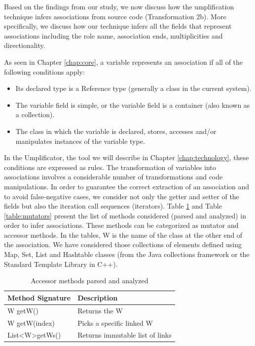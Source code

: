 Based on the findings from our study, we now discuss how the umplification technique infers associations from source code (Transformation 2b). More specifically, we discuss how our technique infers all the fields that represent associations including the role name, association ends, multiplicities and directionality.

As seen in Chapter \ref{chap:core}, a variable represents an association if all of the following conditions apply:
\begin{itemize}
\item Its declared type is a Reference type (generally a class in the current system).
\item The variable field is simple, or the variable field is a container (also known as a collection).
\item The class in which the variable is declared, stores, accesses and/or manipulates instances of the variable type.
\end{itemize}

In the Umplificator, the tool we will describe in Chapter \ref{chap:technology}, these conditions are expressed as rules. The transformation of variables into associations involves a considerable number of transformations and code manipulations. In order to guarantee the correct extraction of an association and to avoid false-negative cases, we consider not only the getter and setter of the fields but also the iteration call sequences (iterators). Table \ref{table:accessors} and Table \ref{table:mutators} present the list of methods considered (parsed and analyzed) in order to infer associations. These methods can be categorized as mutator and accessor methods. In the tables, W is the name of the class at the other end of the association. We have considered those collections of elements defined using Map, Set, List and Hashtable classes (from the Java collections framework or the Standard Template Library in C++).

\begin{table}
\caption{Accessor methods parsed and analyzed}
\label{table:accessors}
\centering
\begin{tabular}{ll}
\toprule
\rowcolor[HTML]{BBDAFF}
\textbf{Method Signature}   & \textbf{Description}                               \\ 
\hline
W getW()  		& Returns the W    \\ 
W getW(index)   & Picks a specific linked W   \\ 
List\textless W\textgreater getWs()   & Returns immutable list of links  \\ 
\hline
\end{tabular}
\end{table}

